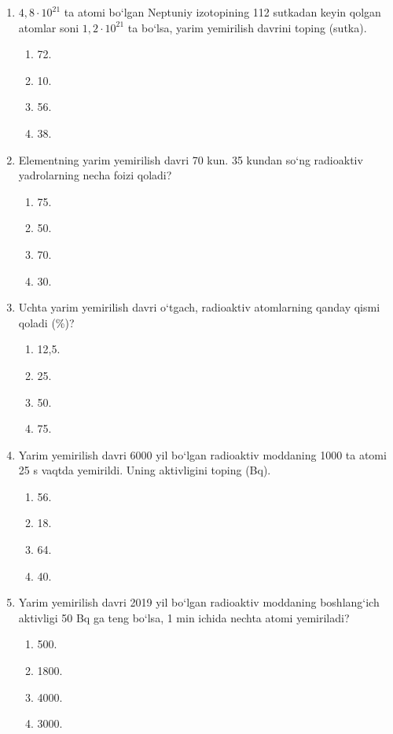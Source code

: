 \begin{enumerate}
\item $4,8\cdot 10^{21}$ ta atomi bo‘lgan Neptuniy izotopining 112 sutkadan keyin qolgan atomlar soni $1,2\cdot 10^{21}$ ta bo‘lsa, yarim yemirilish davrini toping (sutka).
\begin{enumerate}[label=\Alph*)]
\item 72.
\item 10.
\item 56.
\item 38.
\end{enumerate}

\item Elementning yarim yemirilish davri 70 kun. 35 kundan so‘ng radioaktiv yadrolarning necha foizi qoladi?
\begin{enumerate}[label=\Alph*)]
\item 75.
\item 50.
\item 70.
\item 30.
\end{enumerate}

\item Uchta yarim yemirilish davri o‘tgach, radioaktiv atomlarning qanday qismi qoladi (\%)?
\begin{enumerate}[label=\Alph*)]
\item 12,5.
\item 25.
\item 50.
\item 75.
\end{enumerate}

\item Yarim yemirilish davri 6000 yil bo‘lgan radioaktiv moddaning 1000 ta atomi 25 s vaqtda yemirildi. Uning aktivligini toping (Bq).
\begin{enumerate}[label=\Alph*)]
\item 56.
\item 18.
\item 64.
\item 40.
\end{enumerate}

\item Yarim yemirilish davri 2019 yil bo‘lgan radioaktiv moddaning boshlang‘ich aktivligi 50 Bq ga teng bo‘lsa, 1 min ichida nechta atomi yemiriladi?
\begin{enumerate}[label=\Alph*)]
\item 500.
\item 1800.
\item 4000.
\item 3000.
\end{enumerate}


\end{enumerate}
